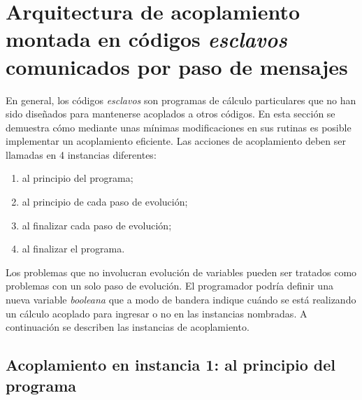 \section{Arquitectura de acoplamiento montada en códigos \textit{esclavos} comunicados por paso de mensajes}
\label{2:arquitectura-mpi}

En general, los códigos \textit{esclavos} son programas de cálculo particulares que no han sido diseñados para mantenerse acoplados a otros códigos.
En esta sección se demuestra cómo mediante unas mínimas modificaciones en sus rutinas es posible implementar un acoplamiento eficiente.
Las acciones de acoplamiento deben ser llamadas en 4 instancias diferentes:
\begin{enumerate}
\item al principio del programa;
\item al principio de cada paso de evolución;
\item al finalizar cada paso de evolución;
\item al finalizar el programa.
\end{enumerate}
Los problemas que no involucran evolución de variables pueden ser tratados como problemas con un solo paso de evolución.
El programador podría definir una nueva variable \textit{booleana} que a modo de bandera indique cuándo se está realizando un cálculo acoplado para ingresar o no en las instancias nombradas.
A continuación se describen las instancias de acoplamiento.


\subsection*{Acoplamiento en instancia 1: al principio del programa}

